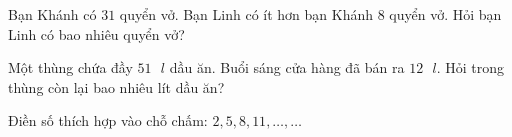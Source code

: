 \begin{bt}[1,5 điểm]
Bạn Khánh có $31$ quyển vở. Bạn Linh có ít hơn bạn Khánh $8$ quyển vở. Hỏi bạn Linh có bao nhiêu quyển vở?
\end{bt}

\begin{bt}[1,0 điểm]
Một thùng chứa đầy $51\text{ }l$ dầu ăn. Buổi sáng cửa hàng đã bán ra $12\text{ }l$. Hỏi trong thùng còn lại bao nhiêu lít dầu ăn?
\end{bt}

\begin{bt}[1,0 điểm]
Điền số thích hợp vào chỗ chấm: $2, 5, 8, 11, \dots, \dots$
\end{bt}
